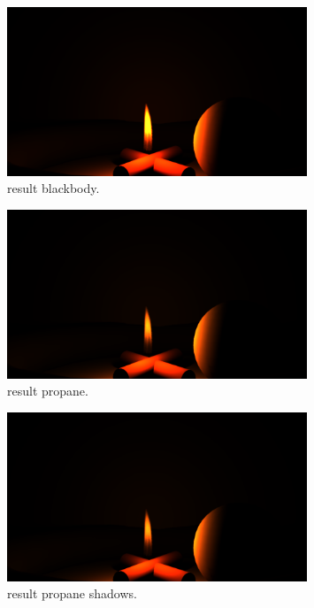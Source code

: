 \begin{figure}[htbp!]
	\centering
	\includegraphics[width=0.8\textwidth, trim={8cm 0 8cm 10cm}, clip]{img/result_blackbody}
	\caption{result blackbody.}
	\label{fig:result_blackbody}
\end{figure}

\begin{figure}[htbp!]
	\centering
	\includegraphics[width=0.8\textwidth, trim={8cm 0 8cm 10cm}, clip]{img/result_propane}
	\caption{result propane.}
	\label{fig:result_propane}
\end{figure}

\begin{figure}[htbp!]
	\centering
	\includegraphics[width=0.8\textwidth, trim={8cm 0 8cm 10cm}, clip]{img/result_propane_shadows}
	\caption{result propane shadows.}
	\label{fig:result_propane_shadows}
\end{figure}

